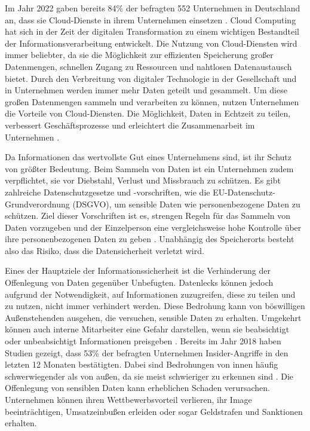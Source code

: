Im Jahr 2022 gaben bereits 84\% der befragten 552 Unternehmen in Deutschland an, dass sie Cloud-Dienste in ihrem Unternehmen einsetzen \cite{KPMG.2022}. Cloud Computing hat sich in der Zeit der digitalen Transformation zu einem wichtigen Bestandteil der Informationsverarbeitung entwickelt. Die Nutzung von Cloud-Diensten wird immer beliebter, da sie die Möglichkeit zur effizienten Speicherung großer Datenmengen, schnellen Zugang zu Ressourcen und nahtlosen Datenaustausch bietet. Durch den Verbreitung von digitaler Technologie in der Gesellschaft und in Unternehmen werden immer mehr Daten geteilt und gesammelt. Um diese großen Datenmengen sammeln und verarbeiten zu können, nutzen Unternehmen die Vorteile von Cloud-Diensten. Die Möglichkeit, Daten in Echtzeit zu teilen, verbessert Geschäftsprozesse und erleichtert die Zusammenarbeit im Unternehmen \cite{Surianarayanan.2023b}. %

Da Informationen das wertvollste Gut eines Unternehmens sind, ist ihr Schutz von größter Bedeutung. Beim Sammeln von Daten ist ein Unternehmen zudem verpflichtet, sie vor Diebstahl, Verlust und Missbrauch zu schützen. Es gibt zahlreiche Datenschutzgesetze und -vorschriften, wie die EU-Datenschutz-Grundverordnung (DSGVO), um sensible Daten wie personenbezogene Daten zu schützen. Ziel dieser Vorschriften ist es, strengen Regeln für das Sammeln von Daten vorzugeben und der Einzelperson eine vergleichsweise hohe Kontrolle über ihre personenbezogenen Daten zu geben \cite{Kuzina.2023}. %
Unabhängig des Speicherorts besteht also das Risiko, dass die Datensicherheit verletzt wird.

Eines der Hauptziele der Informationssicherheit ist die Verhinderung der Offenlegung von Daten gegenüber Unbefugten. Datenlecks können jedoch aufgrund der Notwendigkeit, auf Informationen zuzugreifen, diese zu teilen und zu nutzen, nicht immer verhindert werden. Diese Bedrohung kann von böswilligen Außenstehenden ausgehen, die versuchen, sensible Daten zu erhalten. Umgekehrt können auch interne Mitarbeiter eine Gefahr darstellen, wenn sie beabsichtigt oder unbeabsichtigt Informationen preisgeben \cite{Alneyadi.2016}. Bereits im Jahr 2018 haben Studien gezeigt, dass 53\% der befragten Unternehmen Insider-Angriffe in den letzten 12 Monaten bestätigten. Dabei sind Bedrohungen von innen häufig schwerwiegender als von außen, da sie meist schwieriger zu erkennen sind \cite{CATechnologies.2018}.
Die Offenlegung von sensiblen Daten kann erheblichen Schaden verursachen. Unternehmen können ihren Wettbewerbsvorteil verlieren, ihr Image beeinträchtigen, Umsatzeinbußen erleiden oder sogar Geldstrafen und Sanktionen erhalten.

